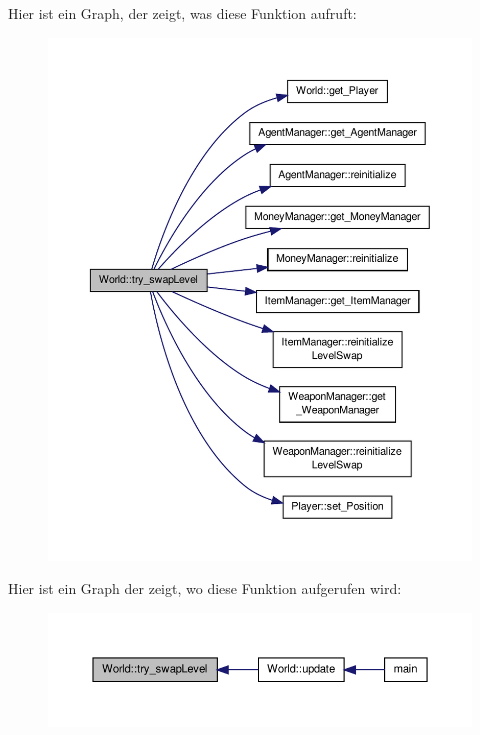 Hier ist ein Graph, der zeigt, was diese Funktion aufruft\-:\nopagebreak
\begin{figure}[H]
\begin{center}
\leavevmode
\includegraphics[width=350pt]{class_world_a227f2998664ae3586190752920ee2713_cgraph}
\end{center}
\end{figure}




Hier ist ein Graph der zeigt, wo diese Funktion aufgerufen wird\-:\nopagebreak
\begin{figure}[H]
\begin{center}
\leavevmode
\includegraphics[width=350pt]{class_world_a227f2998664ae3586190752920ee2713_icgraph}
\end{center}
\end{figure}


